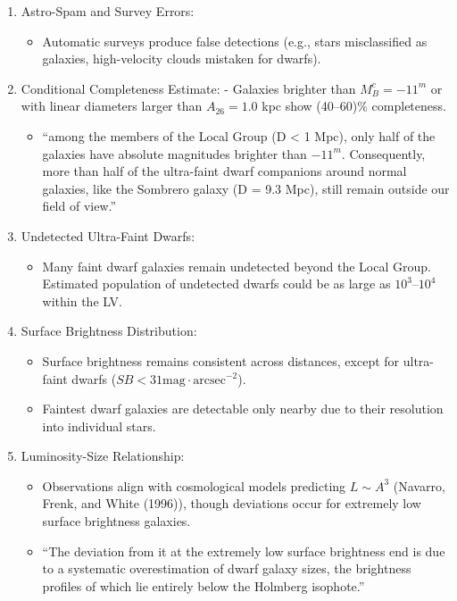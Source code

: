 \documentclass[
]{article}
\providecommand{\tightlist}{%
  \setlength{\itemsep}{0pt}\setlength{\parskip}{0pt}}\usepackage{longtable,booktabs,array}
\begin{document}
\begin{enumerate}
\def\labelenumi{\arabic{enumi}.}
\setcounter{enumi}{1}
\tightlist
\item
  Astro-Spam and Survey Errors:

  \begin{itemize}
  \tightlist
  \item
    Automatic surveys produce false detections (e.g., stars
    misclassified as galaxies, high-velocity clouds mistaken for
    dwarfs).
  \end{itemize}
\item
  Conditional Completeness Estimate: - Galaxies brighter than
  \(M_B^c = -11^m\) or with linear diameters larger than
  \(A_{26} = 1.0\) kpc show (40--60)\% completeness.

  \begin{itemize}
  \tightlist
  \item
    ``among the members of the Local Group (D \textless{} 1 Mpc), only
    half of the galaxies have absolute magnitudes brighter than
    \(−11^m\). Consequently, more than half of the ultra-faint dwarf
    companions around normal galaxies, like the Sombrero galaxy (D = 9.3
    Mpc), still remain outside our field of view.''
  \end{itemize}
\item
  Undetected Ultra-Faint Dwarfs:

  \begin{itemize}
  \tightlist
  \item
    Many faint dwarf galaxies remain undetected beyond the Local Group.
    Estimated population of undetected dwarfs could be as large as
    \(10^3–10^4\) within the LV.
  \end{itemize}
\item
  Surface Brightness Distribution:

  \begin{itemize}
  \tightlist
  \item
    Surface brightness remains consistent across distances, except for
    ultra-faint dwarfs (\(SB <31 \text{mag}\cdot\text{arcsec}^{-2}\)).
  \item
    Faintest dwarf galaxies are detectable only nearby due to their
    resolution into individual stars.
  \end{itemize}
\item
  Luminosity-Size Relationship:

  \begin{itemize}
  \tightlist
  \item
    Observations align with cosmological models predicting \(L\sim A^3\)
    (Navarro, Frenk, and White (1996)), though deviations occur for
    extremely low surface brightness galaxies.
  \item
    ``The deviation from it at the extremely low surface brightness end
    is due to a systematic overestimation of dwarf galaxy sizes, the
    brightness profiles of which lie entirely below the Holmberg
    isophote.''
  \end{itemize}
\end{enumerate}
\end{document}
